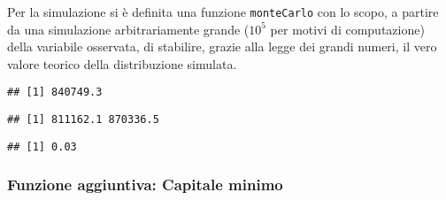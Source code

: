 \documentclass[
]{article}
\newenvironment{Shaded}{\begin{snugshade}}{\end{snugshade}}
\newcommand{\AttributeTok}[1]{\textcolor[rgb]{0.77,0.63,0.00}{#1}}
\newcommand{\ControlFlowTok}[1]{\textcolor[rgb]{0.13,0.29,0.53}{\textbf{#1}}}
\newcommand{\DecValTok}[1]{\textcolor[rgb]{0.00,0.00,0.81}{#1}}
\newcommand{\FloatTok}[1]{\textcolor[rgb]{0.00,0.00,0.81}{#1}}
\newcommand{\FunctionTok}[1]{\textcolor[rgb]{0.00,0.00,0.00}{#1}}
\newcommand{\NormalTok}[1]{#1}
\newcommand{\OtherTok}[1]{\textcolor[rgb]{0.56,0.35,0.01}{#1}}
\newcommand{\SpecialCharTok}[1]{\textcolor[rgb]{0.00,0.00,0.00}{#1}}
\begin{document}
Per la simulazione si è definita una funzione \texttt{monteCarlo} con lo
scopo, a partire da una simulazione arbitrariamente grande (\(10^5\) per
motivi di computazione) della variabile osservata, di stabilire, grazie
alla legge dei grandi numeri, il vero valore teorico della distribuzione
simulata.

\begin{Shaded}
\end{Shaded}

\begin{verbatim}
## [1] 840749.3
\end{verbatim}

\begin{Shaded}
\end{Shaded}

\begin{verbatim}
## [1] 811162.1 870336.5
\end{verbatim}

\begin{Shaded}
\end{Shaded}

\begin{verbatim}
## [1] 0.03
\end{verbatim}

\hypertarget{funzione-aggiuntiva-capitale-minimo}{%
\subsubsection{Funzione aggiuntiva: Capitale
minimo}\label{funzione-aggiuntiva-capitale-minimo}}
\end{document}
